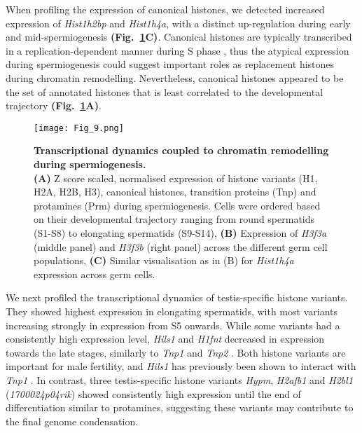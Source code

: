 When profiling the expression of canonical histones, we detected increased expression of \textit{Hist1h2bp} and \textit{Hist1h4a}, with a distinct up-regulation during early and mid-spermiogenesis \textbf{(Fig.~\ref{fig3:spermiogenesis}C)}. Canonical histones are typically transcribed in a replication-dependent manner during S phase \citep{Marzluff2002}, thus the atypical expression during spermiogenesis could suggest important roles as replacement histones during chromatin remodelling. Nevertheless, canonical histones appeared to be the set of annotated histones that is least correlated to the developmental trajectory \textbf{(Fig.~\ref{fig3:spermiogenesis}A)}.

\newpage

\begin{figure}[!h]
\centering
\texttt{[image: Fig\_9.png]}
\caption[Transcriptional dynamics and chromatin remodelling during spermiogenesis]{\textbf{Transcriptional dynamics coupled to chromatin remodelling during spermiogenesis.} \\
\textbf{(A)} Z score scaled, normalised expression of histone variants (H1, H2A, H2B, H3), canonical histones, transition proteins (Tnp) and protamines (Prm) during spermiogenesis. Cells were ordered based on their developmental trajectory ranging from round spermatids (S1-S8) to elongating spermatids (S9-S14), \textbf{(B)} Expression of \textit{H3f3a} (middle panel) and \textit{H3f3b} (right panel) across the different germ cell populations, \textbf{(C)} Similar visualisation as in (B) for \textit{Hist1h4a} expression across germ cells. }
\label{fig3:spermiogenesis}
\end{figure}

\newpage

We next profiled the transcriptional dynamics of testis-specific histone variants. They showed highest expression in elongating spermatids, with most variants increasing strongly in expression from S5 onwards. While some variants had a consistently high expression level, \textit{Hils1} and \textit{H1fnt} decreased in expression towards the late stages, similarly to \textit{Tnp1} and \textit{Tnp2} \citep{Zhao2004}. Both histone variants are important for male fertility, and \textit{Hils1} has previously been shown to interact with \textit{Tnp1} \citep{Tanaka2005}. In contrast, three testis-specific histone variants \textit{Hypm}, \textit{H2afb1} and \textit{H2bl1} (\textit{1700024p04rik}) showed consistently high expression until the end of differentiation similar to protamines, suggesting these variants may contribute to the final genome condensation.

